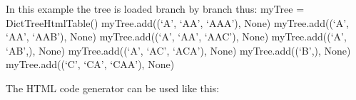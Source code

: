 \documentclass[letterpaper,10pt,english]{sphinxmanual}
\begin{document}
\begin{fulllineitems}
\begin{sphinxVerbatim}[commandchars=\\\{\}]
                      
               
\end{sphinxVerbatim}

In this example the tree is loaded branch by branch thus:
myTree = DictTreeHtmlTable()
myTree.add((‘A’, ‘AA’, ‘AAA’), None)
myTree.add((‘A’, ‘AA’, ‘AAB’), None)
myTree.add((‘A’, ‘AA’, ‘AAC’), None)
myTree.add((‘A’, ‘AB’,), None)
myTree.add((‘A’, ‘AC’, ‘ACA’), None)
myTree.add((‘B’,), None)
myTree.add((‘C’, ‘CA’, ‘CAA’), None)

The HTML code generator can be used like this:

\begin{sphinxVerbatim}[commandchars=\\\{\}]
   
       
       
             
\end{sphinxVerbatim}


\end{fulllineitems}
\end{document}
